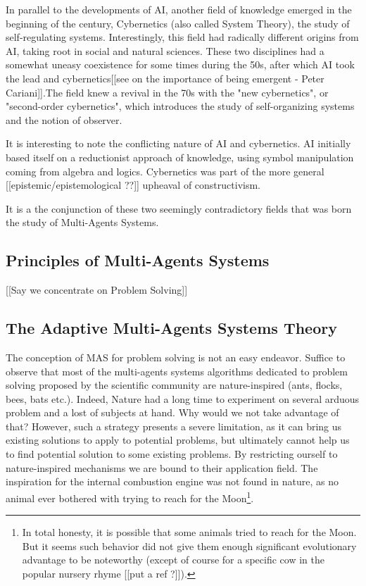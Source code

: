 In parallel to the developments of AI, another field of knowledge emerged in the beginning of the century, Cybernetics (also called System Theory), the study of self-regulating systems. Interestingly, this field had radically different origins from AI, taking root in social and natural sciences. These two disciplines had a somewhat uneasy coexistence for some times during the 50s, after which AI took the lead and cybernetics[[see on the importance of being emergent - Peter Cariani]].The field knew a revival in the 70s with the "new cybernetics", or "second-order cybernetics", which introduces the study of self-organizing systems and the notion of observer.

It is interesting to note the conflicting nature of AI and cybernetics. AI initially based itself on a reductionist approach of knowledge, using symbol manipulation coming from algebra and logics. Cybernetics was part of the more general [[epistemic/epistemological ??]] upheaval of constructivism.

It is a the conjunction of these two seemingly contradictory fields that was born the study of Multi-Agents Systems.

\subsection{Principles of Multi-Agents Systems}

[[Say we concentrate on Problem Solving]]

\subsection{The Adaptive Multi-Agents Systems Theory}

The conception of MAS for problem solving is not an easy endeavor. Suffice to observe that most of the multi-agents systems algorithms dedicated to problem solving proposed by the scientific community are nature-inspired (ants, flocks, bees, bats etc.). Indeed, Nature had a long time to experiment on several arduous problem and a lost of subjects at hand. Why would we not take advantage of that? However, such a strategy presents a severe limitation, as it can bring us existing solutions to apply to potential problems, but ultimately cannot help us to find potential solution to some existing problems. By restricting ourself to nature-inspired mechanisms we are bound to their application field.
The inspiration for the internal combustion engine was not found in nature, as no animal ever bothered with trying to reach for the Moon\footnote{In total honesty, it is possible that some animals tried to reach for the Moon. But it seems such behavior did not give them enough significant evolutionary advantage to be noteworthy (except of course for a specific cow in the popular nursery rhyme [[put a ref ?]]).}.

